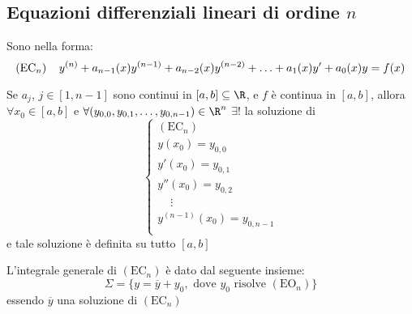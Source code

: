 \subsection{Equazioni differenziali lineari di ordine $n$}

Sono nella forma:
\begin{equation}
    (\mbox{EC}_n) \mspace{20 mu} y^{(n)} + a_{n-1}(x) y^{(n-1)} + a_{n-2}(x) y^{(n-2)} + \dotsc + a_1(x) y' + a_0(x) y = f(x)
\end{equation}

\begin{theorem}
    Se $a_j$, $j \in [1, n-1]$ sono continui in $[a, b] \subseteq \R$, e $f$ è continua in $[a,b]$, allora $\forall x_0 \in [a,b]$ e $\forall (y_{0,0}, y_{0,1}, \dotsc, y_{0,n-1}) \in \R^n$ $\exists!$ la soluzione di
    \begin{equation}
        \begin{cases}
            (\mbox{EC}_n) \\
            y(x_0) = y_{0,0} \\
            y'(x_0) = y_{0,1} \\
            y''(x_0) = y_{0,2} \\
            \phantom{xx}\vdots \\
            y^{(n-1)}(x_0) = y_{0,n-1} \\
        \end{cases}
    \end{equation}
    e tale soluzione è definita su tutto $[a,b]$
\end{theorem}

\begin{theorem}[Struttura]
    L'integrale generale di $(\mbox{EC}_n)$ è dato dal seguente insieme:
    \begin{equation}
        \Sigma = \{ y = \overline{y} + y_0, \mbox{ dove } y_0 \mbox{ risolve } (\mbox{EO}_n) \}
    \end{equation}
    essendo $\overline{y}$ una soluzione di $(\mbox{EC}_n)$
\end{theorem}